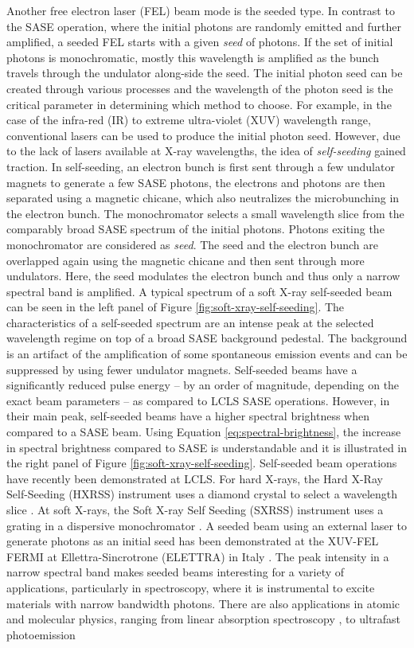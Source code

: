 Another free electron laser (FEL) beam mode is the seeded type. In contrast to the SASE operation, where the initial photons are randomly emitted and further amplified, a seeded FEL starts with a given \textit{seed} of photons. If the set of initial photons is monochromatic, mostly this wavelength is amplified as the bunch travels through the undulator along-side the seed. The initial photon seed can be created through various processes and the wavelength of the photon seed is the critical parameter in determining which method to choose. For example, in the case of the infra-red (IR) to extreme ultra-violet (XUV) wavelength range, conventional lasers can be used to produce the initial photon seed. However, due to the lack of lasers available at X-ray wavelengths, the idea of \textit{self-seeding} gained traction. In self-seeding, an electron bunch is first sent through a few undulator magnets to generate a few SASE photons, the electrons and photons are then separated using a magnetic chicane, which also neutralizes the microbunching in the electron bunch. The monochromator selects a small wavelength slice from the comparably broad SASE spectrum of the initial photons. Photons exiting the monochromator are considered as \textit{seed}. The seed and the electron bunch are overlapped again using the magnetic chicane and then sent through more undulators. Here, the seed modulates the electron bunch and thus only a narrow spectral band is amplified. A typical spectrum of a soft X-ray self-seeded beam can be seen in the left panel of Figure \ref{fig:soft-xray-self-seeding}. The characteristics of a self-seeded spectrum are an intense peak at the selected wavelength regime on top of a broad SASE background pedestal. The background is an artifact of the amplification of some spontaneous emission events and can be suppressed by using fewer undulator magnets. Self-seeded beams have a significantly reduced pulse energy -- by an order of magnitude, depending on the exact beam parameters -- as compared to LCLS SASE operations. However, in their main peak, self-seeded beams have a higher spectral brightness when compared to a SASE beam. Using Equation \eqref{eq:spectral-brightness}, the increase in spectral brightness compared to SASE is understandable and it is illustrated in the right panel of Figure \ref{fig:soft-xray-self-seeding}. Self-seeded beam operations have recently been demonstrated at LCLS. For hard X-rays, the Hard X-Ray Self-Seeding (HXRSS) instrument uses a diamond crystal to select a wavelength slice \citep{Amann-2012-NatPho}. At soft X-rays, the Soft X-ray Self Seeding (SXRSS) instrument uses a grating in a dispersive monochromator \citep{Ratner-2015-PRL}. A seeded beam using an external laser to generate photons as an initial seed has been demonstrated at the XUV-FEL FERMI at Ellettra-Sincrotrone (ELETTRA) in Italy \citep{Allaria-2012-NatPho}. The peak intensity in a narrow spectral band makes seeded beams interesting for a variety of applications, particularly in spectroscopy, where it is instrumental to excite materials with narrow bandwidth photons. There are also applications in atomic and molecular physics, ranging from linear absorption spectroscopy \citep{Ferguson-2014-Unpublished}, to ultrafast photoemission 